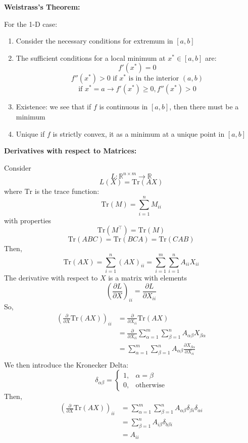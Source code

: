\documentclass{article}
\begin{document}
\noindent
\textbf{Weistrass's Theorem:}

\noindent
For the 1-D case:
\begin{enumerate}
    \item Consider the necessary conditions for extremum in $[a, b]$
    \item The sufficient conditions for a local minimum at $x^* \in [a, b]$ are:
    \[f'(x^*) = 0\]
    \[f''(x^*) > 0\text{ if }x^*\text{ is in the interior }(a, b)\]
    \[\text{if }x^* = a \rightarrow f'(x^*) \ge 0, f''(x^*) > 0\]
    \item Existence: we see that if $f$ is continuous in $[a,b]$, then there must be a minimum
    \item Unique if $f$ is strictly convex, it as a minimum at a unique point in $[a,b]$
\end{enumerate}
\textbf{Derivatives with respect to Matrices:}

\noindent
Consider
\[L : \mathbb{R}^{n\times m} \rightarrow \mathbb{R}\]
\[L(X) = \text{Tr}(AX)\]
where $\text{Tr}$ is the trace function:
\[\text{Tr}(M) = \sum_{i=1}^{n}M_{ii}\]
with properties
\[\text{Tr}(M^\top) = \text{Tr}(M)\]
\[\text{Tr}(ABC) = \text{Tr}(BCA) = \text{Tr}(CAB)\]
Then,
\[\text{Tr}(AX) = \sum_{i=1}^{n}(AX)_{ii} = \sum_{i=1}^{m}\sum_{i=1}^{n}A_{ii}X_{ii}\]
The derivative with respect to $X$ is a matrix with elements
\[\left(\frac{\partial L}{\partial X}\right)_{ii} = \frac{\partial L}{\partial X_{ii}}\]
So,
\begin{align*}
    \left(\frac{\partial}{\partial X}\text{Tr}(AX)\right)_{ii} &=
    \frac{\partial}{\partial X_{ii}}\text{Tr}(AX) \\
    &= \frac{\partial}{\partial X_{ii}}\sum_{\alpha=1}^{m}
    \sum_{\beta=1}^{n}A_{\alpha\beta}X_{\beta\alpha} \\
    &= \sum_{\alpha=1}^{m}\sum_{\beta=1}^{n}A_{\alpha\beta}
    \frac{\partial X_{\beta\alpha}}{\partial X_{ii}} \\
\end{align*}
We then introduce the Kronecker Delta:
\[\delta_{\alpha\beta} = \begin{cases}
    1, & \alpha = \beta \\
    0, & \text{otherwise}
\end{cases}\]
Then,
\begin{align*}
    \left(\frac{\partial}{\partial X}\text{Tr}(AX)\right)_{ii} &=
    \sum_{\alpha=1}^{m}\sum_{\beta=1}^{n}A_{\alpha\beta}\delta_{\beta i}\delta_{\alpha i} \\
    &= \sum_{\beta=1}^{n}A_{i\beta}\delta_{b\beta i} \\
    &= A_{ii}
\end{align*}
\end{document}
